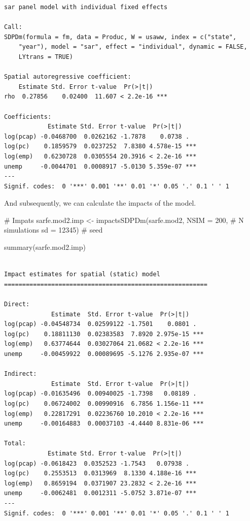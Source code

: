 \documentclass[
  letterpaper,
  DIV=11,
  numbers=noendperiod]{scrreprt}
\newenvironment{Shaded}{\begin{snugshade}}{\end{snugshade}}
\newcommand{\AttributeTok}[1]{\textcolor[rgb]{0.40,0.45,0.13}{#1}}
\newcommand{\CommentTok}[1]{\textcolor[rgb]{0.37,0.37,0.37}{#1}}
\newcommand{\DecValTok}[1]{\textcolor[rgb]{0.68,0.00,0.00}{#1}}
\newcommand{\FunctionTok}[1]{\textcolor[rgb]{0.28,0.35,0.67}{#1}}
\newcommand{\NormalTok}[1]{\textcolor[rgb]{0.00,0.23,0.31}{#1}}
\newcommand{\OtherTok}[1]{\textcolor[rgb]{0.00,0.23,0.31}{#1}}
\begin{document}
\begin{verbatim}
sar panel model with individual fixed effects

Call:
SDPDm(formula = fm, data = Produc, W = usaww, index = c("state", 
    "year"), model = "sar", effect = "individual", dynamic = FALSE, 
    LYtrans = TRUE)

Spatial autoregressive coefficient:
    Estimate Std. Error t-value  Pr(>|t|)    
rho  0.27856    0.02400  11.607 < 2.2e-16 ***

Coefficients:
            Estimate Std. Error t-value  Pr(>|t|)    
log(pcap) -0.0468700  0.0262162 -1.7878    0.0738 .  
log(pc)    0.1859579  0.0237252  7.8380 4.578e-15 ***
log(emp)   0.6230728  0.0305554 20.3916 < 2.2e-16 ***
unemp     -0.0044701  0.0008917 -5.0130 5.359e-07 ***
---
Signif. codes:  0 '***' 0.001 '**' 0.01 '*' 0.05 '.' 0.1 ' ' 1
\end{verbatim}

And subsequently, we can calculate the impacts of the model.

\begin{Shaded}
\begin{Highlighting}[]
\CommentTok{\# Impats}
\NormalTok{sarfe.mod2.imp }\OtherTok{\textless{}{-}} \FunctionTok{impactsSDPDm}\NormalTok{(sarfe.mod2, }
                               \AttributeTok{NSIM =} \DecValTok{200}\NormalTok{, }\CommentTok{\# N simulations}
                               \AttributeTok{sd =} \DecValTok{12345}\NormalTok{) }\CommentTok{\# seed}

\FunctionTok{summary}\NormalTok{(sarfe.mod2.imp)}
\end{Highlighting}
\end{Shaded}

\begin{verbatim}

Impact estimates for spatial (static) model
========================================================

Direct:
             Estimate  Std. Error t-value  Pr(>|t|)    
log(pcap) -0.04548734  0.02599122 -1.7501    0.0801 .  
log(pc)    0.18811130  0.02383583  7.8920 2.975e-15 ***
log(emp)   0.63774644  0.03027064 21.0682 < 2.2e-16 ***
unemp     -0.00459922  0.00089695 -5.1276 2.935e-07 ***

Indirect:
             Estimate  Std. Error t-value  Pr(>|t|)    
log(pcap) -0.01635496  0.00940025 -1.7398   0.08189 .  
log(pc)    0.06724002  0.00990916  6.7856 1.156e-11 ***
log(emp)   0.22817291  0.02236760 10.2010 < 2.2e-16 ***
unemp     -0.00164883  0.00037103 -4.4440 8.831e-06 ***

Total:
            Estimate Std. Error t-value  Pr(>|t|)    
log(pcap) -0.0618423  0.0352523 -1.7543   0.07938 .  
log(pc)    0.2553513  0.0313969  8.1330 4.188e-16 ***
log(emp)   0.8659194  0.0371907 23.2832 < 2.2e-16 ***
unemp     -0.0062481  0.0012311 -5.0752 3.871e-07 ***
---
Signif. codes:  0 '***' 0.001 '**' 0.01 '*' 0.05 '.' 0.1 ' ' 1
\end{verbatim}
\end{document}
